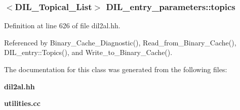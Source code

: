 \subsubsection{$<${\bf DIL\_\-Topical\_\-List}$>$ DIL\_\-entry\_\-parameters::topics}\label{classDIL__entry__parameters_m0}




Definition at line 626 of file dil2al.hh.

Referenced by Binary\_\-Cache\_\-Diagnostic(), Read\_\-from\_\-Binary\_\-Cache(), DIL\_\-entry::Topics(), and Write\_\-to\_\-Binary\_\-Cache().

The documentation for this class was generated from the following files:\begin{CompactItemize}
\item 
{\bf dil2al.hh}\item 
{\bf utilities.cc}\end{CompactItemize}
